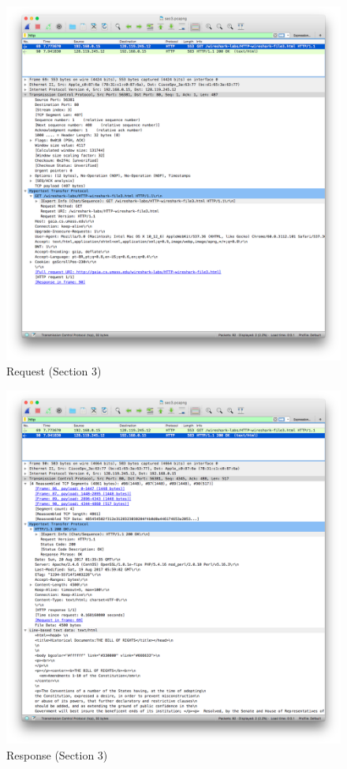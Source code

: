 \documentclass[11pt]{article}
\begin{document}
\begin{figure}[H]
\centering
\caption{Request (Section 3)}
\includegraphics[width=\textwidth]{03-request}
\end{figure}

\begin{figure}[H]
\centering
\caption{Response (Section 3)}
\includegraphics[width=\textwidth]{03-response}
\end{figure}
\end{document}
